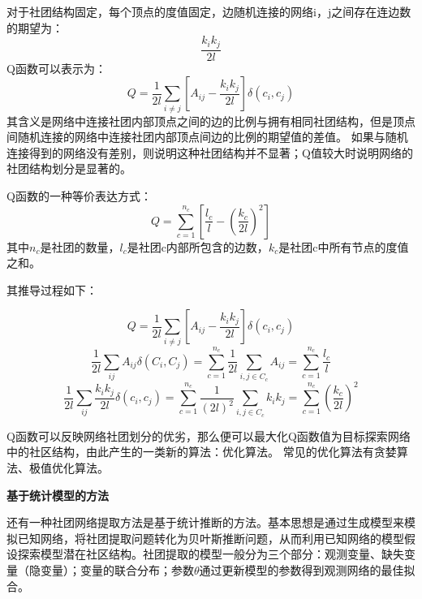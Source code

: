 \documentclass[a4paper,12pt,openany,oneside,utf-8]{ctexbook}
\begin{document}
    对于社团结构固定，每个顶点的度值固定，边随机连接的网络i，j之间存在连边数的期望为：
    \begin{equation}
        \frac{k_i k_j}{2l}
    \end{equation}
    Q函数可以表示为：
    \begin{equation}
        Q=\frac{1}{2l}\sum_{i\neq j}[A_{i j}-\frac{k_i k_j}{2l}]\delta(c_i,c_j)
    \end{equation}
    其含义是网络中连接社团内部顶点之间的边的比例与拥有相同社团结构，但是顶点间随机连接的网络中连接社团内部顶点间边的比例的期望值的差值。
    如果与随机连接得到的网络没有差别，则说明这种社团结构并不显著；Q值较大时说明网络的社团结构划分是显著的。
    
    Q函数的一种等价表达方式：
    \begin{equation}
        Q=\sum_{c=1}^{n_c}[\frac{l_c}{l}-(\frac{k_c}{2l})^2]
    \end{equation}
    其中$n_c$是社团的数量，$l_c$是社团c内部所包含的边数，$k_c$是社团c中所有节点的度值之和。
    
    其推导过程如下：
    
    \begin{equation}
        Q=\frac{1}{2l}\sum_{i\neq j}[A_{i j}-\frac{k_i k_j}{2l}]\delta(c_i,c_j)
    \end{equation}
    \begin{equation}
        \frac{1}{2l}\sum_{i j}A_{i j}\delta(C_i,C_j)=\sum_{c=1}^{n_c}\frac{1}{2l}\sum_{i,j\in C_c}A_{i j}
        =\sum_{c=1}^{n_c}\frac{l_c}{l}
    \end{equation}
    \begin{equation}
        \frac{1}{2l}\sum_{i j}\frac{k_i k_j}{2l}\delta(c_i,c_j)=\sum_{c=1}^{n_c}\frac{1}{(2l)^2}\sum_{i,j\in C_c}k_i k_j=\sum_{c=1}^{n_c}(\frac{k_c}{2l})^2
    \end{equation}
    
    Q函数可以反映网络社团划分的优劣，那么便可以最大化Q函数值为目标探索网络中的社区结构，由此产生的一类新的算法：优化算法。
    常见的优化算法有贪婪算法\cite{ref21}、极值优化算法\cite{ref22}。
    
    \textbf{基于统计模型的方法}
    
    还有一种社团网络提取方法是基于统计推断的方法。基本思想是通过生成模型来模拟已知网络，将社团提取问题转化为贝叶斯推断问题，从而利用已知网络的模型假设探索模型潜在社区结构。社团提取的模型一般分为三个部分：观测变量、缺失变量（隐变量）；变量的联合分布；参数$\theta$通过更新模型的参数得到观测网络的最佳拟合。
    
\end{document}
